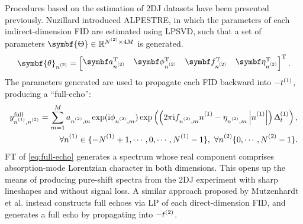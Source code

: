 Procedures based on the estimation of \ac{2DJ} datasets have been
presented previously. Nuzillard introduced
\ac{ALPESTRE}\cite{Nuzillard1996,Martinez2012}, in which
the parameters of each indirect-dimension FID are estimated using \ac{LPSVD},
such that a set of parameters $\symbf{\Theta} \in \mathbb{R}^{\Ntwo
\times 4M}$ is generated.
\begin{equation}
    \symbf{\theta}_{\ntwo} =
    \begin{bmatrix}
        \bda_{\ntwo}\T &
        \bdphi_{\ntwo}\T &
        \bdf_{\ntwo}\T &
        \bdeta_{\ntwo}\T
    \end{bmatrix}\T.
\end{equation}
The parameters generated are used to propagate each FID backward into
$-t^{(1)}$, producing a ``full-echo'':
\begin{equation}
    \begin{split}
        y^{\text{full}}_{\none,\ntwo} = \sum_{m=1}^{M}
            a_{\ntwo,m}
            \exp(\iu \phi_{\ntwo,m})
            \exp\left(\left(2 \pi \iu f_{\ntwo,m} \none
            -\eta_{\ntwo,m}  \left\lvert \none \right\rvert \right)\Dtone\right), \\
        \forall \none \in \lbrace -\None + 1, \cdots, 0, \cdots, \None - 1 \rbrace,\ \forall \ntwo \lbrace 0, \cdots, \Ntwo - 1 \rbrace.
    \end{split}
    \label{eq:full-echo}
\end{equation}
\ac{FT} of \eqref{eq:full-echo} generates a spectrum whose real component comprises absorption-mode
Lorentzian character in both dimensions. This opens up the means of producing
pure-shift spectra from the \ac{2DJ} experiment with sharp lineshapes and
without signal loss. A similar approach proposed by Mutzenhardt et al.
instead constructs full echoes via \ac{LP} of each direct-dimension
\ac{FID}, and generates a full echo by propagating into
$-t^{(2)}$\cite{Mutzenhardt1999}.


